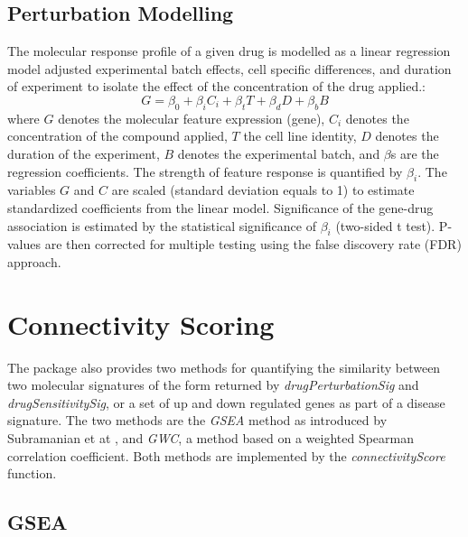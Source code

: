 \documentclass[11pt]{article}
\begin{document}
\subsection{Perturbation Modelling}
The molecular response profile of a given drug is modelled as a linear regression model adjusted experimental batch effects, cell specific differences, and duration of experiment to isolate the effect of the concentration of the drug applied.: 
$$G = \beta_{0} + \beta_{i}C_i + \beta_{t}T + \beta_{d}D + \beta_{b}B$$
where $G$ denotes the molecular feature expression (gene), $C_i$ denotes the concentration of the compound applied, $T$ the cell line identity, $D$ denotes the duration of the experiment,  $B$ denotes the experimental batch, and $\beta$s are the regression coefficients. The strength of feature response is quantified by $\beta_i$. %
The variables $G$ and $C$ are scaled (standard deviation equals to 1) to estimate standardized coefficients from the linear model. Significance of the gene-drug association is estimated by the statistical significance of $\beta_i$ (two-sided t test). P-values are then corrected for multiple testing using the false discovery rate (FDR) approach.


\section{Connectivity Scoring}
The package also provides two methods for quantifying the similarity between two molecular signatures of the form returned by \textit{drugPerturbationSig} and \textit{drugSensitivitySig}, or a set of up and down regulated genes as part of a disease signature. 
The two methods are the \textit{GSEA} method as introduced by Subramanian et at \cite{subramanian_gene_2005}, and \textit{GWC}, a method based on a weighted Spearman correlation coefficient. Both methods are implemented by the \textit{connectivityScore} function.

\subsection{GSEA}
\end{document}
